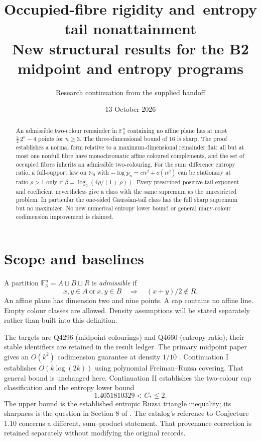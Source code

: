 \documentclass[11pt]{article}
\title{\vspace{-12mm}\textbf{Occupied-fibre rigidity and\ entropy tail nonattainment}\\[4pt]\large New structural results for the B2 midpoint and entropy programs}
\author{Research continuation from the supplied handoff}
\date{13 October 2026}
\theoremstyle{remark}\newtheorem{remark}[theorem]{Remark}
\newcommand{\F}{\mathbb F_3}
\newcommand{\N}{\mathbb N_0}
\begin{document}
\maketitle\vspace{-6mm}
\begin{abstract}
An admissible two-colour remainder in $\F^n$ containing no affine plane has
at most $\frac52\,2^n-4$ points for $n\geq3$. The three-dimensional bound of
$16$ is sharp. The proof establishes a normal form relative to a
maximum-dimensional remainder flat: all but at most one nonfull fibre
have monochromatic affine coloured complements, and the set of occupied
fibres inherits an admissible two-colouring. For the sum--difference entropy
ratio, a full-support law on $\N$ with
$-\log p_n=c n^\beta+o(n^\beta)$ can be stationary at ratio $\rho>1$ only if
$\beta=\log_2(4\rho/(1+\rho))$. Every prescribed positive tail exponent and
coefficient nevertheless give a class with the same supremum as the
unrestricted problem. In particular the one-sided Gaussian-tail class has
the full sharp supremum but no maximizer. No new numerical entropy lower
bound or general many-colour codimension improvement is claimed.
\end{abstract}

\section{Scope and baselines}

A partition $\F^n=A\sqcup B\sqcup R$ is \emph{admissible} if
\[
 x,y\in A\ \text{or}\ x,y\in B \quad\Longrightarrow\quad (x+y)/2\notin R.
\]
An affine plane has dimension two and nine points. A cap contains no affine
line. Empty colour classes are allowed. Density assumptions will be stated
separately rather than built into this definition.

The targets are Q4296 (midpoint colourings) and Q4660 (entropy ratio);
their stable identifiers are retained in the result ledger. The primary
midpoint paper gives an
$O(k^2)$ codimension guarantee at density $1/10$ \cite{midpoint}.
Continuation I \cite{first} establishes $O(k\log(2k))$ using polynomial
Freiman--Ruzsa covering. That general bound is unchanged here.
Continuation II \cite{previous} establishes the two-colour cap classification
and the entropy lower bound
\begin{equation}\label{eq:knownrange}
 1.4051810329<C_*\leq2.
\end{equation}
The upper bound is the established entropic Ruzsa triangle inequality;
its sharpness is the question in Section 8 of \cite{li}. The catalog's
reference to Conjecture 1.10 concerns a different, sum--product statement.
That provenance correction is retained separately without modifying the
original records.
\end{document}

